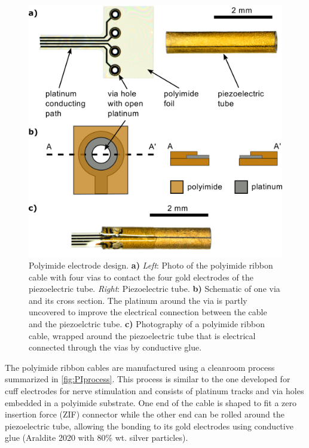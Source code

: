 \documentclass[10pt]{iopart}
\begin{document}
\begin{figure}[h!]\centering \includegraphics[width=\columnwidth]{figures/tubeFoil.png}
      \caption{Polyimide electrode design.
      \textbf{a)} \textit{Left}: Photo of the polyimide ribbon cable with four vias to contact the four gold electrodes of the piezoelectric tube. \textit{Right}: Piezoelectric tube.
      \textbf{b)} Schematic of one via and its cross section. The platinum around the via is partly uncovered to improve the electrical connection between the cable and the piezoelctric tube.
      \textbf{c)} Photography of a polyimide ribbon cable, wrapped around the piezoelectric tube that is electrical connected through the vias by conductive glue.}
      \label{fig:piRolled}
\end{figure}

The polyimide ribbon cables are manufactured using a cleanroom process summarized in \autoref{fig:PIprocess}. This process is similar to the one developed for cuff electrodes for nerve stimulation \cite{Rodriguez2000} and consists of platinum tracks and via holes embedded in a polyimide substrate. One end of the cable is shaped to fit a zero insertion force (ZIF) connector while the other end can be rolled around the piezoelectric tube, allowing the bonding to its gold electrodes using conductive glue (Araldite 2020 with 80\% wt. silver particles).
\end{document}
